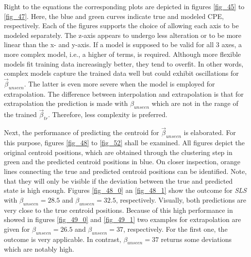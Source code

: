 Right to the equations the corresponding plots are depicted in figures \ref{fig_45} to \ref{fig_47}. 
Here, the blue and green curves indicate true and modeled CPE, respectively.
Each of the figures supports the choice of allowing each axis to be modeled separately.
The z-axis appears to undergo less alteration or to be more linear than the x- and y-axis.
If a model is supposed to be valid for all 3 axes, a more complex model, i.e., a higher of terms, is required.
Although more flexible models fit training data increasingly better, they tend to overfit. 
In other words, complex models capture the trained data well but could exhibit oscillations for $\vec{\beta}_{unseen}$.
The latter is even more severe when the model is employed for extrapolation.
The difference between interpolation and extrapolation is that for extrapolation the prediction is made with $\beta_{unseen}$ which are not in the range of the trained $\vec{\beta}_{tr}$.
Therefore, less complexity is preferred.\newline 

Next, the performance of predicting the centroid for $\vec{\beta}_{unseen}$ is elaborated.
For this purpose, figures \ref{fig_48} to \ref{fig_52} shall be examined.
All figures depict the original centroid positions, which are obtained through the clustering step in green and the predicted centroid positions in blue.
On closer inspection, orange lines connecting the true and predicted centroid positions can be identified. 
Note, that they will only be visible if the deviation between the true and predicted state is high enough.
Figures \ref{fig_48_0} an \ref{fig_48_1} show the outcome for \emph{SLS} with $\beta_{unseen} = 28.5$ and $\beta_{unseen} = 32.5$, respectively.
Visually, both predictions are very close to the true centroid positions.
Because of this high performance in showed in figures \ref{fig_49_0} and \ref{fig_49_1} two examples for extrapolation are given for $\beta_{unseen} = 26.5$ and $\beta_{unseen} = 37$, respectively. 
For the first one, the outcome is very applicable. 
In contrast, $\beta_{unseen} = 37$ returns some deviations which are notably high.
\newline
 


